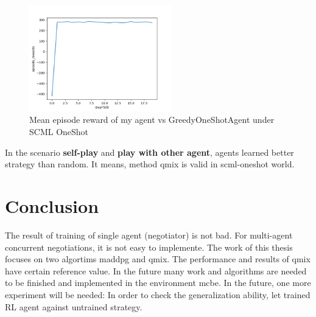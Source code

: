 \begin{figure}[htbp]
\centering
\includegraphics[width=0.55\textwidth]{./images/oneshot_my_vs_greedy.png}
\caption{Mean episode reward of my agent vs GreedyOneShotAgent under SCML OneShot}
\label{fig:oneshot-my-vs-greedy}
\end{figure}

In the scenario \textbf{self-play} and \textbf{play with other agent}, agents learned better strategy than random. It means, method \gls{qmix} is valid in scml-oneshot world.

\section{Conclusion}
The result of training of single agent (negotiator) is not bad. For multi-agent concurrent negotiations, it is not easy to implemente. The work of this thesis focuses on two algortims \gls{maddpg} and \gls{qmix}. The performance and results of \gls{qmix} have certain reference value. In the future many work and algorithms are needed to be finished and implemented in the environment \gls{mcbe}. In the future, one more experiment will be needed: In order to check the generalization ability, let trained RL agent against untrained strategy.